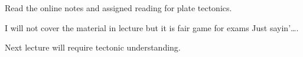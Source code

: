 \documentclass[t]{beamer}
\begin{document}
%
{
\begin{frame}[b]

\end{frame}
}
%
\begin{frame}[t]

	\hangpara Read the online notes and assigned reading for plate tectonics.
	
	\hangpara I will not cover the material in lecture but it is fair game for exams  Just sayin'\dots.
	
	\hangpara Next lecture will require tectonic understanding.
	
\end{frame}
%
\end{document}
